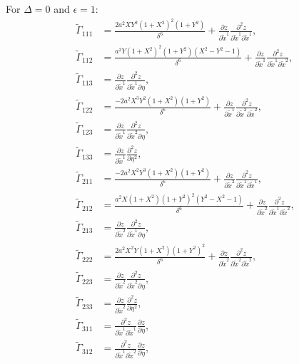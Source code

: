 \documentclass{article}
\begin{document}
For $\Delta=0$ and $\epsilon=1$:
\begin{align}
\tilde{\Gamma}_{111}&=\frac{2a^2XY^2(1+X^2)^2(1+Y^2)}{\delta^6} + \frac{\partial z}{\partial \tilde{x}^1} \frac{\partial^2 z}{\partial \tilde{x}^1 \partial \tilde{x}^1}, \\
\tilde{\Gamma}_{112}&=\frac{a^2Y(1+X^2)^2(1+Y^2)(X^2-Y^2-1)}{\delta^6}+ \frac{\partial z}{\partial \tilde{x}^1}\frac{\partial^2 z}{\partial \tilde{x}^1 \partial \tilde{x}^2}, \\
\tilde{\Gamma}_{113}&=\frac{\partial z}{\partial \tilde{x}^1}\frac{\partial^2 z}{\partial \tilde{x}^1 \partial \eta}, \\
\tilde{\Gamma}_{122}&=\frac{-2a^2X^3Y^2(1+X^2)(1+Y^2)}{\delta^6} + \frac{\partial z}{\partial \tilde{x}^1} \frac{\partial^2 z}{\partial \tilde{x}^2\partial \tilde{x}^2}, \\
\tilde{\Gamma}_{123}&=\frac{\partial z}{\partial \tilde{x}^1} \frac{\partial^2 z}{\partial \tilde{x}^2 \partial \eta}, \\
\tilde{\Gamma}_{133}&=\frac{\partial z}{\partial \tilde{x}^1} \frac{\partial^2 z}{\partial \eta^2}, \\
\tilde{\Gamma}_{211}&=\frac{-2a^2X^2Y^3(1+X^2)(1+Y^2)}{\delta^6} + \frac{\partial z}{\partial \tilde{x}^2} \frac{\partial^2 z}{\partial \tilde{x}^1\partial \tilde{x}^1}, \\
\tilde{\Gamma}_{212}&=\frac{a^2X(1+X^2)(1+Y^2)^2(Y^2-X^2-1)}{\delta^6} + \frac{\partial z}{\partial \tilde{x}^2} \frac{\partial^2 z}{\partial \tilde{x}^1 \partial \tilde{x}^2}, \\
\tilde{\Gamma}_{213}&=\frac{\partial z}{\partial \tilde{x}^2} \frac{\partial^2 z}{\partial \tilde{x}^1 \partial \eta}, \\
\tilde{\Gamma}_{222}&=\frac{2a^2X^2Y(1+X^2)(1+Y^2)^2}{\delta^6} + \frac{\partial z}{\partial \tilde{x}^2} \frac{\partial^2 z}{\partial \tilde{x}^2 \partial \tilde{x}^2}, \\
\tilde{\Gamma}_{223}&=\frac{\partial z}{\partial \tilde{x}^2} \frac{\partial^2 z}{\partial \tilde{x}^2 \partial \eta}, \\
\tilde{\Gamma}_{233}&=\frac{\partial z}{\partial \tilde{x}^2} \frac{\partial^2 z}{\partial \eta^2}, \\
\tilde{\Gamma}_{311}&=\frac{\partial^2 z}{\partial \tilde{x}^1 \partial \tilde{x}^1} \frac{\partial z}{\partial \eta}, \\
\tilde{\Gamma}_{312}&=\frac{\partial^2 z}{\partial \tilde{x}^1 \partial \tilde{x}^2} \frac{\partial z}{\partial \eta}, \\

\end{align}
\end{document}
